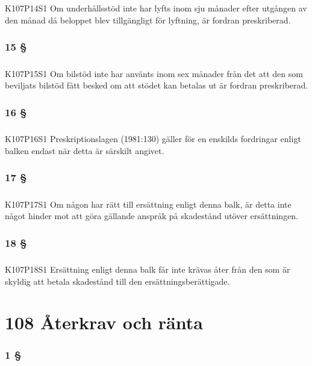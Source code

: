 \documentclass[a4paper,notitlepage,openany,10pt]{book}
\begin{document}
\paragraph*{}
{\tiny K107P14S1}
Om underhållsstöd inte har lyfts inom sju månader efter utgången av den månad då beloppet blev tillgängligt för lyftning, är fordran preskriberad.
\subsection*{15 §}
\paragraph*{}
{\tiny K107P15S1}
Om bilstöd inte har använts inom sex månader från det att den som beviljats bilstöd fått besked om att stödet kan betalas ut är fordran preskriberad.
\subsection*{16 §}
\paragraph*{}
{\tiny K107P16S1}
Preskriptionslagen (1981:130) gäller för en enskilds fordringar enligt balken endast när detta är särskilt angivet.
\subsection*{17 §}
\paragraph*{}
{\tiny K107P17S1}
Om någon har rätt till ersättning enligt denna balk, är detta inte något hinder mot att göra gällande anspråk på skadestånd utöver ersättningen.
\subsection*{18 §}
\paragraph*{}
{\tiny K107P18S1}
Ersättning enligt denna balk får inte krävas åter från den som är skyldig att betala skadestånd till den ersättningsberättigade.
\chapter*{108 Återkrav och ränta}
\subsection*{1 §}
\end{document}
